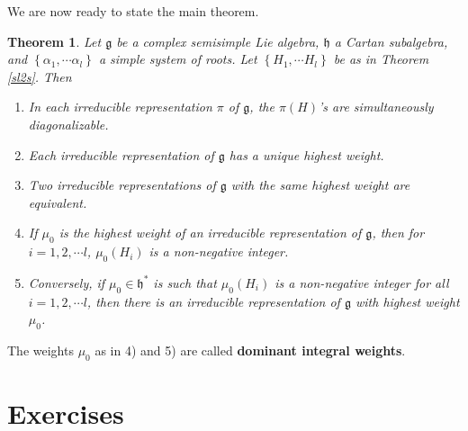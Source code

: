 \documentclass[12pt]{amsbook}
\let \frak = \mathfrak
\theoremstyle{plain}
\newtheorem{theorem}{Theorem}
\numberwithin{equation}{chapter}
\numberwithin{theorem}{chapter}
\begin{document}
We are now ready to state the main theorem.

\begin{theorem}
\label{classify.ss.reps}Let $\frak{g}$ be a complex semisimple Lie algebra,
$\frak{h}$ a Cartan subalgebra, and $\left\{  \alpha_{1},\cdots\alpha
_{l}\right\}  $ a simple system of roots. Let $\left\{  H_{1},\cdots
H_{l}\right\}  $ be as in Theorem \ref{sl2s}. Then

\begin{enumerate}
\item  In each irreducible representation $\pi$ of $\frak{g}$, the $\pi(H)$'s
are simultaneously diagonalizable.

\item  Each irreducible representation of $\frak{g}$ has a unique highest weight.

\item  Two irreducible representations of $\frak{g}$ with the same highest
weight are equivalent.

\item  If $\mu_{0}$ is the highest weight of an irreducible representation of
$\frak{g}$, then for $i=1,2,\cdots l$, $\mu_{0}(H_{i})$ is a non-negative integer.

\item  Conversely, if $\mu_{0}\in\frak{h}^{\ast}$ is such that $\mu_{0}%
(H_{i})$ is a non-negative integer for all $i=1,2,\cdots l$, then there is an
irreducible representation of $\frak{g}$ with highest weight $\mu_{0}$.
\end{enumerate}
\end{theorem}

The weights $\mu_{0}$ as in 4) and 5) are called \textbf{dominant integral
weights}.

\section{Exercises}
\end{document}
